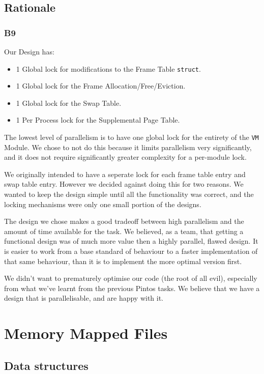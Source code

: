 \documentclass[a4wide, 11pt]{article}
\newcommand{\tx}{\texttt}
\begin{document}
\subsection{Rationale}
\subsubsection{B9}

Our Design has:
\begin{itemize}
\item 1 Global lock for modifications to the Frame Table \tx{struct}.
\item 1 Global lock for the Frame Allocation/Free/Eviction.
\item 1 Global lock for the Swap Table.
\item 1 Per Process lock for the Supplemental Page Table.
\end{itemize}

The lowest level of parallelism is to have one global lock for the entirety of the \tx{VM} Module. We chose to not do this because it limits parallelism very significantly, and it does not require significantly greater complexity for a per-module lock.

We originally intended to have a seperate lock for each frame table entry and swap table entry. However we decided against doing this for two reasons. We wanted to keep the design simple until all the functionality was correct, and the locking mechanisms were only one small portion of the designs.

The design we chose makes a good tradeoff between high parallelism and the amount of time available for the task. We believed, as a team, that getting a functional design was of much more value then a highly parallel, flawed design. It is easier to work from a base standard of behaviour to a faster implementation of that same behaviour, than it is to implement the more optimal version first.

We didn't want to prematurely optimise our code (the root of all evil), especially from what we've learnt from the previous Pintos tasks. We believe that we have a design that is parallelisable, and are happy with it.

\section{Memory Mapped Files}
\subsection{Data structures}
\end{document}
